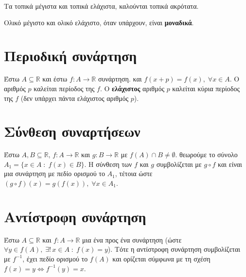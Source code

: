 \begin{rems}
\item {}
  \begin{myitemize}
    \item Τα τοπικά μέγιστα και τοπικά ελάχιστα, καλούνται \textcolor{Col1}{τοπικά
      ακρότατα}.
    \item Ολικό μέγιστο και ολικό ελάχιστο, όταν υπάρχουν, είναι \textbf{μοναδικά}.
  \end{myitemize}
\end{rems}

\section{Περιοδική συνάρτηση}

\begin{dfn}
  Έστω $ A \subseteq \mathbb{R} $ και έστω $ f \colon A \to \mathbb{R} $ συνάρτηση. 
  και $ f(x+p) = f(x), \; \forall x \in A $. Ο αριθμός $ p $ καλείται
  \textcolor{Col1}{περίοδος} της $f$. 
  Ο \textbf{ελάχιστος} αριθμός $ p $ καλείται \textcolor{Col1}{κύρια περίοδος} της $f$ (δεν υπάρχει πάντα
  ελάχιστος αριθμός $p$). 
\end{dfn}

\section{Σύνθεση συναρτήσεων}

Έστω $ A, B \subseteq \mathbb{R} $, $ f \colon A \to \mathbb{R} $ και $ g \colon
B \to \mathbb{R} $ με $ f(A) \cap B \neq \emptyset $. θεωρούμε το σύνολο $ A_{1} = \{
x \in A \; : \; f(x) \in B \} $. Η σύνθεση των $f$ και $g$ συμβολίζεται με $ g \circ f $
και είναι μια συνάρτηση με πεδίο ορισμού το $ A_{1} $, τέτοια ώστε $ (g \circ f)(x) = 
g(f(x)), \; \forall x \in A_{1} $.

\section{Αντίστροφη συνάρτηση}

\begin{dfn}
  Έστω $ A \subseteq \mathbb{R} $ και $ f \colon A \to \mathbb{R} $ μια ένα προς ένα 
  συνάρτηση (ώστε $ \forall y \in f(A), \; \exists! \, x \in A \; : \; f(x)=y $). Τότε
  η αντίστροφη συνάρτηση συμβολίζεται με $ f^{-1} $, έχει πεδίο ορισμού το $ f(A) $ 
  και ορίζεται σύμφωνα με τη σχέση $ f(x)=y \Leftrightarrow f^{-1}(y)=x $.
\end{dfn}

